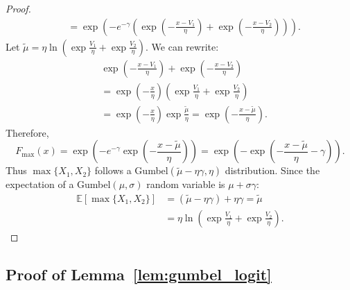 \documentclass[12pt]{article}
\theoremstyle{plain}
\begin{document}
\begin{proof}
\begin{align*}
		            & = \exp\left(-e^{-\gamma}\left(\exp\left(-\frac{x - V_1}{\eta}\right) + \exp\left(-\frac{x - V_2}{\eta}\right)\right)\right).
	\end{align*}
	Let $\tilde{\mu} = \eta \ln\left(\exp\frac{V_1}{\eta} +
		\exp\frac{V_2}{\eta}\right)$. We can rewrite:
	\begin{align*}
		 & \exp\left(-\frac{x - V_1}{\eta}\right) + \exp\left(-\frac{x - V_2}{\eta}\right)                                   \\
		 & = \exp\left(-\frac{x}{\eta}\right)\left(\exp\frac{V_1}{\eta} + \exp\frac{V_2}{\eta}\right)                        \\
		 & = \exp\left(-\frac{x}{\eta}\right) \exp\frac{\tilde{\mu}}{\eta} = \exp\left(-\frac{x - \tilde{\mu}}{\eta}\right).
	\end{align*}
	Therefore,
	\begin{equation*}
		F_{\max}(x) = \exp\left(-e^{-\gamma}\exp\left(-\frac{x - \tilde{\mu}}{\eta}\right)\right) = \exp\left(-\exp\left(-\frac{x - \tilde{\mu}}{\eta} - \gamma\right)\right).
	\end{equation*}
	Thus $\max\{X_1, X_2\}$ follows a Gumbel$(\tilde{\mu} - \eta\gamma, \eta)$
	distribution. Since the expectation of a Gumbel$(\mu, \sigma)$ random variable
	is $\mu + \sigma\gamma$:
	\begin{align*}
		\mathbb{E}[\max\{X_1, X_2\}] & = (\tilde{\mu} - \eta\gamma) + \eta\gamma = \tilde{\mu}             \\
		                             & = \eta \ln\left(\exp\frac{V_1}{\eta} + \exp\frac{V_2}{\eta}\right).
	\end{align*}
\end{proof}

\subsection{Proof of Lemma~\ref{lem:gumbel_logit}}\label{app:proof_gumbel_logit}
\end{document}
